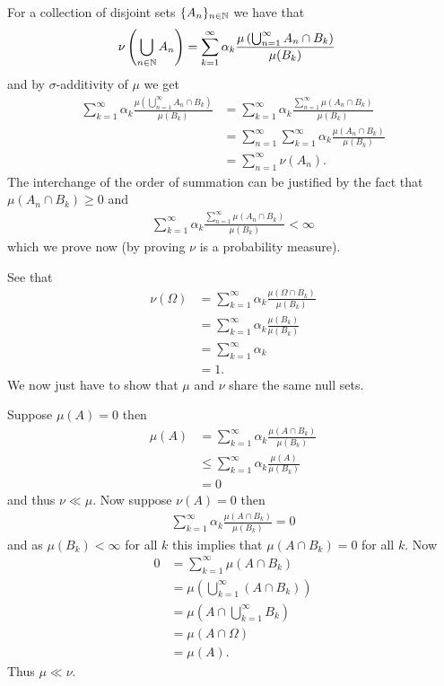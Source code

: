 \documentclass{unswmaths}
\begin{document}
For a collection of disjoint sets $ \{ A_n \}_{n \in \mathbb{N}} $ we have that
\begin{align}
	\nu\left( \bigcup_{n\in\mathbb{N}} A_n \right) &= \sum_{k=1}^\infty \alpha_k \frac{\mu\left( \bigcup_{n=1}^\infty A_n \cap B_k \right)}{\mu(B_k)}
\end{align}
and by $ \sigma$-additivity of $ \mu $ we get
\begin{align}
	\sum_{k=1}^\infty \alpha_k \frac{\mu\left( \bigcup_{n=1}^\infty A_n \cap B_k \right)}{\mu(B_k)} &= \sum_{k=1}^\infty \alpha_k \frac{\sum_{n=1}^\infty \mu\left( A_n \cap B_k \right)}{\mu(B_k)} \\
	&= \sum_{n=1}^\infty  \sum_{k=1}^\infty \alpha_k \frac{\mu\left( A_n \cap B_k \right)}{\mu(B_k)} \\
	&= \sum_{n=1}^\infty \nu(A_n).
\end{align}
The interchange of the order of summation can be justified by the fact that
$ \mu(A_n \cap B_k) \geq 0 $ and 
\begin{align}
\sum_{k=1}^\infty \alpha_k \frac{\sum_{n=1}^\infty \mu\left( A_n \cap B_k \right)}{\mu(B_k)} < \infty
\end{align}
which we prove now (by proving $ \nu $ is a probability measure).

See that
\begin{align}
	\nu(\Omega) &= \sum_{k=1}^\infty \alpha_k \frac{\mu(\Omega\cap B_k)}{\mu(B_k)} \\
	&= \sum_{k=1}^\infty \alpha_k \frac{\mu( B_k)}{\mu(B_k)} \\
	&= \sum_{k=1}^\infty \alpha_k \\
	&= 1.
\end{align}
We now just have to show that $ \mu $ and $ \nu $ share the same null sets. 

Suppose $ \mu(A) = 0 $ then
\begin{align}
	\mu(A) &= \sum_{k=1}^\infty \alpha_k \frac{\mu(A \cap B_k)}{\mu(B_k)} \\
		&\leq \sum_{k=1}^\infty \alpha_k \frac{\mu(A)}{\mu(B_k)} \\
		&= 0
\end{align}
and thus $ \nu \ll \mu $.
Now suppose $ \nu(A) =0 $ then
\begin{align}
	\sum_{k=1}^\infty \alpha_k \frac{\mu(A \cap B_k)}{\mu(B_k)} = 0
\end{align}
and as $ \mu(B_k) < \infty $ for all $ k $ this implies that $ \mu(A \cap B_k ) = 0$ for all $ k $. Now
\begin{align}
	0 &= \sum_{k=1}^\infty \mu(A \cap B_k) \\
		&= \mu\left( \bigcup_{k=1}^\infty (A \cap B_k) \right) \\
		&= \mu\left( A \cap \bigcup_{k=1}^\infty B_k\right) \\
		&= \mu(A \cap \Omega) \\
		&= \mu(A).
\end{align}
Thus $ \mu \ll \nu $.
\end{document}
